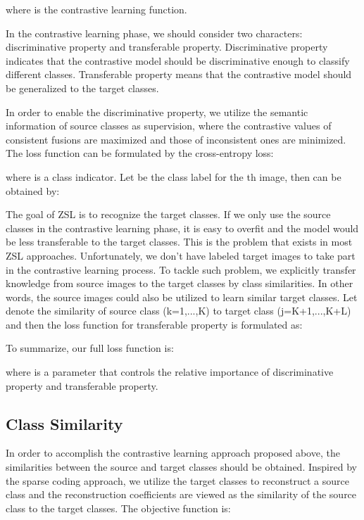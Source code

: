 \documentclass[10pt,twocolumn,letterpaper]{article}
\begin{document}
where  is the contrastive learning function.

In the contrastive learning phase, we should consider two characters: discriminative property and transferable property. Discriminative property indicates that the contrastive model should be discriminative enough to classify different classes. Transferable property means that the contrastive model should be generalized to the target classes.

In order to enable the discriminative property, we utilize the semantic information of source classes as supervision, where the contrastive values of consistent fusions are maximized and those of inconsistent ones are minimized. The loss function can be formulated by the cross-entropy loss:

where  is a class indicator. Let  be the class label for the th image, then  can be obtained by:


The goal of ZSL is to recognize the target classes. If we only use the source classes in the contrastive learning phase, it is easy to overfit and the model would be less transferable to the target classes. This is the problem that exists in most ZSL approaches. Unfortunately, we don't have labeled target images to take part in the contrastive learning process. To tackle such problem, we explicitly transfer knowledge from source images to the target classes by class similarities. In other words, the source images could also be utilized to learn similar target classes. Let  denote the similarity of source class  (k=1,...,K) to target class  (j=K+1,...,K+L) and then the loss function for transferable property is formulated as:


To summarize, our full loss function is:

where  is a parameter that controls the relative importance of discriminative property and transferable property.

\subsection{Class Similarity}

In order to accomplish the contrastive learning approach proposed above, the similarities between the source and target classes should be obtained. Inspired by the sparse coding approach, we utilize the target classes to reconstruct a source class and the reconstruction coefficients are viewed as the similarity of the source class to the target classes. The objective function is:
\end{document}
